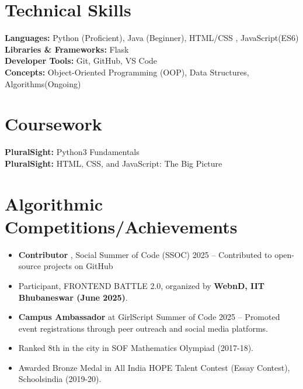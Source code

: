 \documentclass[letterpaper,11pt]{article}
\newcommand{\resumeItem}[1]{
  \item\small{
    {#1 \vspace{-2pt}}
  }
}
\newcommand{\resumeItemListStart}{\begin{itemize}}
\newcommand{\resumeItemListEnd}{\end{itemize}\vspace{-5pt}}
\begin{document}
\section{Technical Skills}
\begin{itemize}[leftmargin=0.15in, label={}]
    {\item{
       
        \textbf{Languages:} Python (Proficient), Java (Beginner), HTML/CSS , JavaScript(ES6)\\
        \textbf{Libraries \& Frameworks:} Flask\\
        \textbf{Developer Tools:} Git, GitHub, VS Code\\
        \textbf{Concepts:} Object-Oriented Programming (OOP), Data Structures, Algorithms(Ongoing)\\
        
    }}
\end{itemize}

\section{ Coursework}
\begin{itemize}[leftmargin=0.15in, label={}]
\small{\item{
       
        \textbf{PluralSight:} Python3 Fundamentals \\
        \textbf{PluralSight:} HTML, CSS, and JavaScript: The Big Picture\\ }}

\end{itemize}

\section{Algorithmic Competitions/Achievements}
\resumeItemListStart
  \resumeItem{\textbf{Contributor} , Social Summer of Code (SSOC) 2025 – Contributed to open-source projects on GitHub }
  \resumeItem{Participant, FRONTEND BATTLE 2.0, organized by \textbf{WebnD, IIT Bhubaneswar (June 2025)}.}
  \resumeItem{\textbf{Campus Ambassador} at GirlScript Summer of Code 2025 – Promoted event registrations through peer outreach and social media platforms.}
  \resumeItem{Ranked 8th in the city in SOF Mathematics Olympiad (2017-18).}
  \resumeItem{Awarded Bronze Medal in All India HOPE Talent Contest (Essay Contest), Schoolsindia (2019-20).}
\resumeItemListEnd



\end{document}
